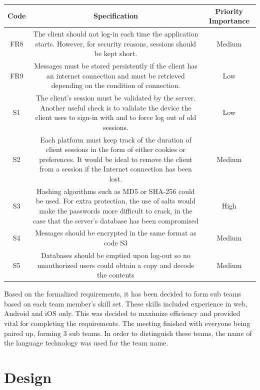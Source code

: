 \documentclass{article}
\begin{document}
\begin{table}[H]
	\centering
	\begin{tabularx}{17cm}{|c|C|c|}
		\hline
		\textbf{Code} & \textbf{Specification} & \textbf{Priority Importance} \\ \hline
		\hline
 
		FR8& The client should not log-in each time the application starts. However, for security reasons, sessions should be kept short.  & Medium    \\ \hline
		FR9& Messages must be stored persistently if the client has an internet connection and must be retrieved depending on the condition of  connection.  & Low     \\ \hline
		\hline
		S1& The client's session must be validated by the server. Another useful check is to validate the device the client uses to sign-in with and to force log out of old sessions. &  Low   \\ \hline
		S2& Each platform must keep track of the duration of client sessions in the form of either cookies or preferences. It would be ideal to remove the client from a session if the Internet connection has been lost. & Medium     \\ \hline
		S3& Hashing algorithms such as MD5 or SHA-256 could be used. For extra protection, the use of salts would make the passwords more difficult to crack, in the case that the server's database has been compromised  & High     \\ \hline
		S4& Messages should be encrypted in the same format as code S3  & Medium    \\ \hline
		S5& Databases should be emptied upon log-out so no unauthorized users could obtain a copy and decode the contents  & Medium    \\ \hline
	\end{tabularx}
\end{table}

	Based on the formalized requirements, it has been decided to form sub teams based on each team member's skill set. These skills included experience in web, Android and iOS only. This was decided to maximize efficiency and provided vital for completing the requirements. The meeting finished with everyone being paired up, forming 3 sub teams. In order to distinguish these teams, the name of the language technology was used for the team name.\par
	
\newpage
	\section{Design}
\end{document}
